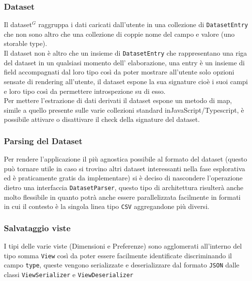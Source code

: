 \subsubsection{Dataset}
Il dataset$^{G}$ raggruppa i dati caricati dall'utente in una collezione di
\texttt{DatasetEntry} che non sono altro che una collezione di coppie nome del
campo e valore (uno storable type). \\

\noindent
Il dataset non è altro che un insieme di \texttt{DatasetEntry} che rappresentano
una riga del dataset in un qualsiasi momento dell' elaborazione, una entry è un
insieme di field accompagnati dal loro tipo così da poter mostrare all'utente
solo opzioni sensate di rendering all'utente, il dataset espone la sua signature
cioè i suoi campi e loro tipo così da permettere introspezione su di esso.\\

\noindent
Per mettere l'estrazione di dati derivati il dataset espone un metodo di map, 
simile a quello presente sulle varie collezioni standard inJavaScript/Typescript, 
è possibile attivare o disattivare il check della signature del dataset.



\subsubsection{Parsing del Dataset}

Per rendere l'applicazione il più agnostica possibile al formato del dataset 
(questo può tornare utile in caso si trovino altri dataset interessanti nella
fase esplorativa ed è praticamente gratis da implementare) si è deciso di
nascondere l'operazione dietro una interfaccia \texttt{DatasetParser}, questo
tipo di architettura risulterà anche molto flessibile in quanto potrà anche
essere parallelizzata facilmente in formati in cui il contesto è la singola
linea tipo \texttt{CSV} aggregandone più diversi.

\subsubsection{Salvataggio viste}
I tipi delle varie viste (Dimensioni e Preferenze) sono agglomerati all'interno
del tipo somma \texttt{View} così da poter essere facilmente identificate
discriminando il campo \texttt{type}, queste vengono serializzate e
deserializzare dal formato \texttt{JSON} dalle classi \texttt{ViewSerializer} e
\texttt{ViewDeserializer}

